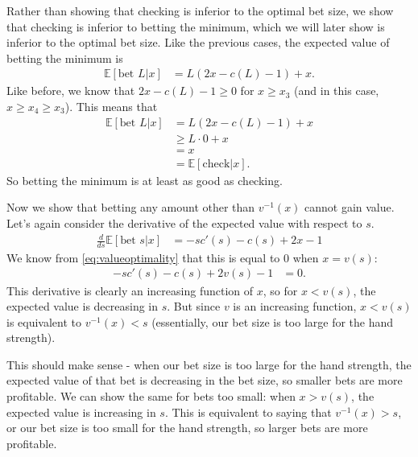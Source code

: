 \documentclass[../../main/main.tex]{subfiles}
\begin{document}
\begin{customproof}
\begin{enumerate}
\begin{enumerate}
                    Rather than showing that checking is inferior to the optimal bet size, we show that checking is inferior to betting the minimum, which we will later show is inferior to the optimal bet size. Like the previous cases, the expected value of betting the minimum is
                    \begin{align*}
                        \mathbb{E}[\text{bet } L | x] & = L(2x - c(L) - 1) + x. 
                    \end{align*}
                    Like before, we know that $2x - c(L) - 1 \geq 0$ for $x \geq x_3$ (and in this case, $x \geq x_4 \geq x_3$). This means that
                    \begin{align*}
                        \mathbb{E}[\text{bet } L | x] & = L(2x - c(L) - 1) + x \\
                        & \geq L \cdot 0 + x \\
                        & = x \\
                        &= \mathbb{E}[\text{check} | x].
                    \end{align*}
                    So betting the minimum is at least as good as checking.

                    Now we show that betting any amount other than $v^{-1}(x)$ cannot gain value.
                    Let's again consider the derivative of the expected value with respect to $s$.
                    \begin{align*}
                        \frac{d}{ds} \mathbb{E}[\text{bet } s | x] & = -s c'(s) - c(s) + 2x - 1
                    \end{align*}
                    We know from \ref{eq:valueoptimality} that this is equal to $0$ when $x = v(s)$:
                    \begin{align*}
                        -s c'(s) - c(s) + 2v(s) - 1 &= 0.
                    \end{align*} 
                    This derivative is clearly an increasing function of $x$, so for $x < v(s)$, the expected value is decreasing in $s$. But since $v$ is an increasing function, $x < v(s)$ is equivalent to $v^{-1}(x) < s$ (essentially, our bet size is too large for the hand strength).
                    
                    This should make sense - when our bet size is too large for the hand strength, the expected value of that bet is decreasing in the bet size, so smaller bets are more profitable. We can show the same for bets too small: when $x > v(s)$, the expected value is increasing in $s$. This is equivalent to saying that $v^{-1}(x) > s$, or our bet size is too small for the hand strength, so larger bets are more profitable. 
                    

\end{enumerate}
\end{enumerate}
\end{customproof}
\end{document}
